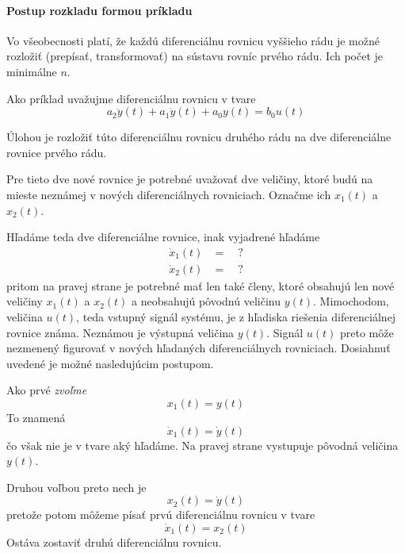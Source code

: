 \documentclass[a4paper, 10pt, ]{article}
\begin{document}
\paragraph{Postup rozkladu formou príkladu}

Vo všeobecnosti platí, že každú diferenciálnu rovnicu vyššieho rádu je možné rozložiť (prepísať, transformovať) na sústavu rovníc prvého rádu. Ich počet je minimálne $n$.

Ako príklad uvažujme diferenciálnu rovnicu v tvare
\begin{equation} \label{povonadr2}
    a_2 \ddot y(t) + a_1 \dot y(t) + a_0 y(t) = b_0 u(t)
\end{equation}

Úlohou je rozložiť túto diferenciálnu rovnicu druhého rádu na dve diferenciálne rovnice prvého rádu.

Pre tieto dve nové rovnice je potrebné uvažovať dve veličiny, ktoré budú na mieste neznámej v nových diferenciálnych rovniciach. Označme ich $x_1(t)$ a $x_2(t)$.

Hľadáme teda dve diferenciálne rovnice, inak vyjadrené hľadáme
\begin{align*}
    \dot x_1(t) &= \quad ? \\
    \dot x_2(t) &= \quad ? 
\end{align*}
pritom na pravej strane je potrebné mať len také členy, ktoré obsahujú len nové veličiny $x_1(t)$ a $x_2(t)$ a neobsahujú pôvodnú veličinu $y(t)$. Mimochodom, veličina $u(t)$, teda vstupný signál systému, je z hľadiska riešenia diferenciálnej rovnice známa. Neznámou je výstupná veličina $y(t)$. Signál $u(t)$ preto môže nezmenený figurovať v nových hľadaných diferenciálnych rovniciach. Dosiahnuť uvedené je možné nasledujúcim postupom. 

Ako prvé \emph{zvoľme}
\begin{equation} \label{volba1}
    x_1(t) = y(t)
\end{equation}
To znamená
\begin{equation}
    \dot x_1(t) = \dot y(t)
\end{equation}
čo však nie je v tvare aký hľadáme. Na pravej strane vystupuje pôvodná veličina $y(t)$.

Druhou voľbou preto nech je
\begin{equation} \label{volba2}
    x_2(t) = \dot y(t)
\end{equation}
pretože potom môžeme písať prvú diferenciálnu rovnicu v tvare
\begin{equation}
    \dot x_1(t) = x_2(t)
\end{equation}
Ostáva zostaviť druhú diferenciálnu rovnicu. 
\end{document}
